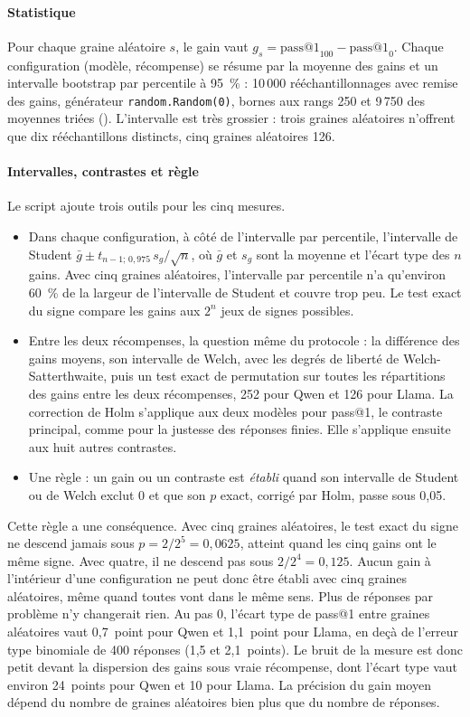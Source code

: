 \paragraph{Statistique} Pour chaque graine aléatoire $s$, le gain vaut $g_s = \text{pass@1}_{100} -
\text{pass@1}_{0}$. Chaque configuration (modèle, récompense) se résume par la moyenne des gains et
un intervalle bootstrap par percentile à 95~\% : 10\,000 rééchantillonnages avec remise des gains,
générateur \texttt{random.Random(0)}, bornes aux rangs 250 et 9\,750 des moyennes triées
(). L'intervalle est très grossier : trois graines aléatoires
n'offrent que dix rééchantillons distincts, cinq graines aléatoires 126.

\paragraph{Intervalles, contrastes et règle} Le script  ajoute trois outils
pour les cinq mesures.
\begin{itemize}
  \item Dans chaque configuration, à côté de l'intervalle par percentile, l'intervalle de Student
    $\bar g \pm t_{n-1;\,0{,}975}\, s_g/\sqrt n$, où $\bar g$ et $s_g$ sont la moyenne et l'écart type des
    $n$ gains. Avec cinq graines aléatoires, l'intervalle par percentile n'a qu'environ 60~\% de la largeur de
    l'intervalle de Student et couvre trop peu. Le test exact du signe compare les gains aux $2^n$ jeux de signes possibles.
  \item Entre les deux récompenses, la question même du protocole : la différence des gains moyens, son
    intervalle de Welch, avec les degrés de liberté de Welch-Satterthwaite, puis un test exact de permutation
    sur toutes les répartitions des gains entre les deux récompenses, 252 pour Qwen et 126 pour Llama. La
    correction de Holm s'applique aux deux modèles pour pass@1, le contraste principal, comme pour la justesse
    des réponses finies. Elle s'applique ensuite aux huit autres contrastes.
  \item Une règle : un gain ou un contraste est \emph{établi} quand son intervalle de Student ou de Welch
    exclut 0 et que son $p$ exact, corrigé par Holm, passe sous 0,05.
\end{itemize}
Cette règle a une conséquence. Avec cinq graines aléatoires, le test exact du
signe ne descend jamais sous $p = 2/2^5 = 0{,}0625$, atteint quand les cinq gains ont le même signe. Avec
quatre, il ne descend pas sous $2/2^4 = 0{,}125$. Aucun gain à l'intérieur d'une configuration ne peut donc
être établi avec cinq graines aléatoires, même quand toutes vont dans le même sens. Plus de réponses par
problème n'y changerait rien. Au pas 0, l'écart type de pass@1 entre graines aléatoires vaut 0,7~point pour
Qwen et 1,1~point pour Llama, en deçà de l'erreur type binomiale de 400 réponses (1,5 et 2,1~points). Le bruit
de la mesure est donc petit devant la dispersion des gains sous vraie récompense, dont l'écart type vaut
environ 24~points pour Qwen et 10 pour Llama. La précision du gain moyen dépend du nombre de graines aléatoires
bien plus que du nombre de réponses.


